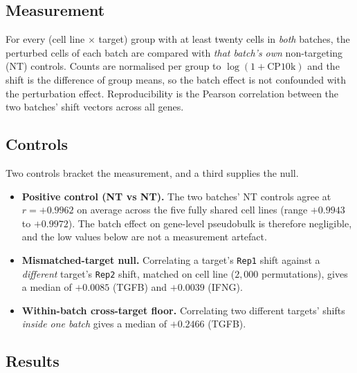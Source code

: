 \documentclass[11pt,a4paper]{article}
\begin{document}
\subsection*{Measurement}

For every (cell line $\times$ target) group with at least twenty cells in \emph{both} batches, the
perturbed cells of each batch are compared with \emph{that batch's own} non-targeting (NT) controls.
Counts are normalised per group to $\log(1+\mathrm{CP10k})$ and the shift is the difference of group
means, so the batch effect is not confounded with the perturbation effect. Reproducibility is the
Pearson correlation between the two batches' shift vectors across all genes.

\subsection*{Controls}

Two controls bracket the measurement, and a third supplies the null.
\begin{itemize}\itemsep2pt
\item \textbf{Positive control (NT vs NT).} The two batches' NT controls agree at $r=+0.9962$ on
average across the five fully shared cell lines (range $+0.9943$ to $+0.9972$). The batch effect on
gene-level pseudobulk is therefore negligible, and the low values below are not a measurement
artefact.
\item \textbf{Mismatched-target null.} Correlating a target's \texttt{Rep1} shift against a
\emph{different} target's \texttt{Rep2} shift, matched on cell line ($2{,}000$ permutations), gives
a median of $+0.0085$ (TGFB) and $+0.0039$ (IFNG).
\item \textbf{Within-batch cross-target floor.} Correlating two different targets' shifts
\emph{inside one batch} gives a median of $+0.2466$ (TGFB).
\end{itemize}

\subsection*{Results}
\end{document}
